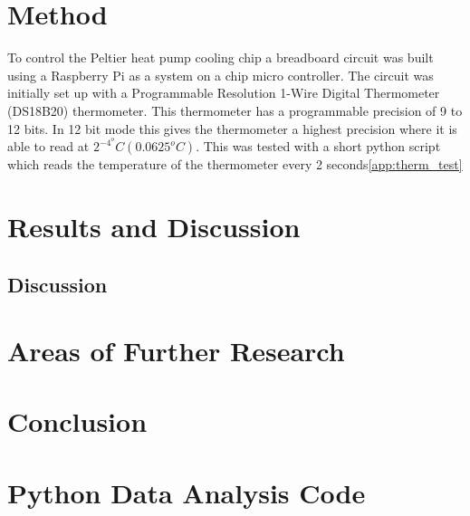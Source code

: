 \documentclass[10pt]{article}
\begin{document}
\section*{Method}
To control the Peltier heat pump cooling chip a breadboard circuit was built using a Raspberry Pi\cite{rpi} as a system on a chip micro controller. The circuit was initially set up with a Programmable Resolution 1-Wire Digital Thermometer (DS18B20) thermometer\cite{thermometer}. This thermometer has a programmable precision of 9 to 12 bits. In 12 bit mode this gives the thermometer a highest precision where it is able to read at $2^{-4}^oC(0.0625^oC)$. This was tested with a short python script which reads the temperature of the thermometer every 2 seconds\ref{app:therm_test}
\section*{Results and Discussion}

\subsection*{Discussion}

\section*{Areas of Further Research}


\section*{Conclusion}






\newpage
\appendix


\newpage
\section{Python Data Analysis Code}\label{ap:code}

 
\lstset{style=mystyle}
 
% 
\end{document}
